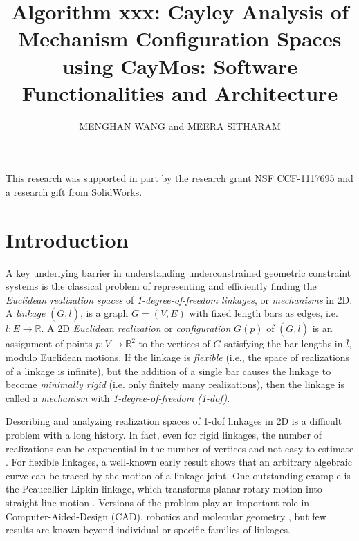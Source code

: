 \documentclass[prodmode,acmtoms]{acmsmall}
\title{Algorithm xxx: Cayley Analysis of Mechanism Configuration Spaces using CayMos: 
Software Functionalities and Architecture }
\author{
MENGHAN WANG and MEERA SITHARAM 
\affil{University of Florida}
}
\begin{document}
\begin{bottomstuff}
This research was supported in part by the research grant NSF CCF-1117695
and a research gift from SolidWorks.
\end{bottomstuff}
\maketitle




\section{Introduction}




A key underlying barrier in understanding underconstrained geometric
constraint systems is the classical problem of representing and efficiently finding 
 the \emph{Euclidean realization spaces} of
\emph{1-degree-of-freedom linkages}, or \emph{mechanisms} in 2D.
A {\em linkage} $(G,\bar{l})$, is a graph $G=(V,E)$ with fixed
length bars as edges, i.e. $\bar{l}: E \rightarrow \mathbb{R}$. 
A 2D \emph{Euclidean realization} or \emph{configuration} $G(p)$ of $(G,\bar{l})$ is 
an assignment of points $p: V \rightarrow \mathbb{R}^2$ to the vertices of $G$ satisfying the bar lengths in $\bar{l}$, 
modulo Euclidean motions. 
If the linkage is \emph{flexible} (i.e., the space of realizations of a
linkage is infinite), but the addition of a
single bar causes the linkage to become \emph{minimally rigid} 
(i.e. only finitely many realizations), then the linkage is called a 
\emph{mechanism} with \emph{1-degree-of-freedom (1-dof)}. 




Describing and analyzing realization spaces of 1-dof linkages in 2D is 
a  difficult problem with a long history. 
In fact, even for rigid linkages, the number of realizations can be exponential in the number of vertices
and not easy to estimate \citep{Borcea2004}. 
For flexible linkages, 
a well-known early result \citep{Kempe1875} 
shows that an arbitrary algebraic curve can be traced by the motion of a linkage joint. 
One outstanding example is the Peaucellier-Lipkin linkage, which transforms planar rotary motion into straight-line motion \citep{Kempe1877}. 
Versions of the problem play an important role in Computer-Aided-Design (CAD), 
robotics and molecular geometry \citep{Sacks2010,Ying1995,Sitharam2005}, but few results are known beyond individual or specific families of linkages. 
\end{document}
